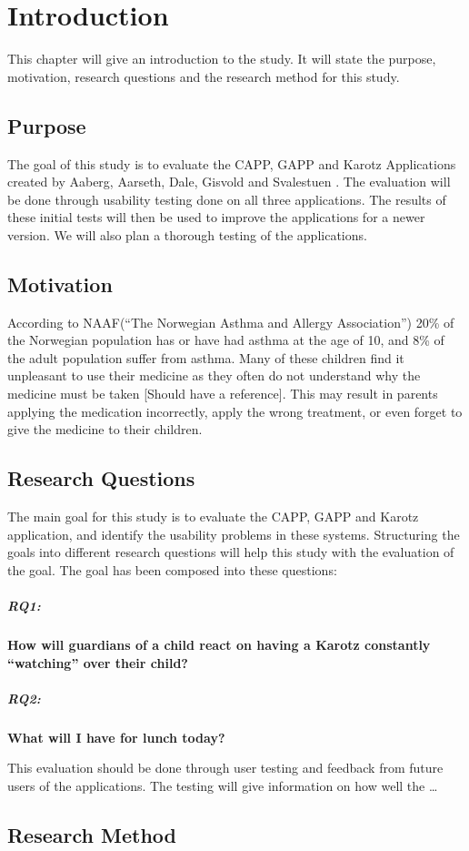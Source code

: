 \chapter{Introduction}
\label{chp:introduction}

This chapter will give an introduction to the study. It will state the purpose, motivation, research questions and the research method for this study. 

\section{Purpose}
\label{sec:purpose}
The goal of this study is to evaluate the CAPP, GAPP and Karotz Applications created by Aaberg, Aarseth, Dale, Gisvold and Svalestuen \cite{CustomerDriven}.
The evaluation will be done through usability testing done on all three applications. The results of these initial tests will then be used to improve the applications for a newer version. 
We will also plan a thorough testing of the applications.


\section{Motivation}
\label{sec:motivation}
According to NAAF(``The Norwegian Asthma and Allergy Association'') 20\% \cite{NAAF} of the Norwegian population has or have had asthma at the age of 10, and 8\% of the adult population suffer from asthma. Many of these children find it unpleasant to use their medicine as they often do not understand why the medicine must be taken [Should have a reference]. This may result in parents applying the medication incorrectly, apply the wrong treatment, or even forget to give the medicine to their children. 


\section{Research Questions}
\label{sec:researchquestions}
The main goal for this study is to evaluate the CAPP, GAPP and Karotz application, and identify the usability problems in these systems. Structuring the goals into different research questions will help this study with the evaluation of the goal. The goal has been composed into these questions:

\paragraph{RQ1:}
\textbf{How will guardians of a child react on having a Karotz constantly ``watching'' over their child?}


\paragraph{RQ2:}
\textbf{What will I have for lunch today?}

This evaluation should be done through user testing and feedback from future users of the applications. The testing will give information on how well the 
\ldots

\section{Research Method}
\label{sec:researchmethod}


